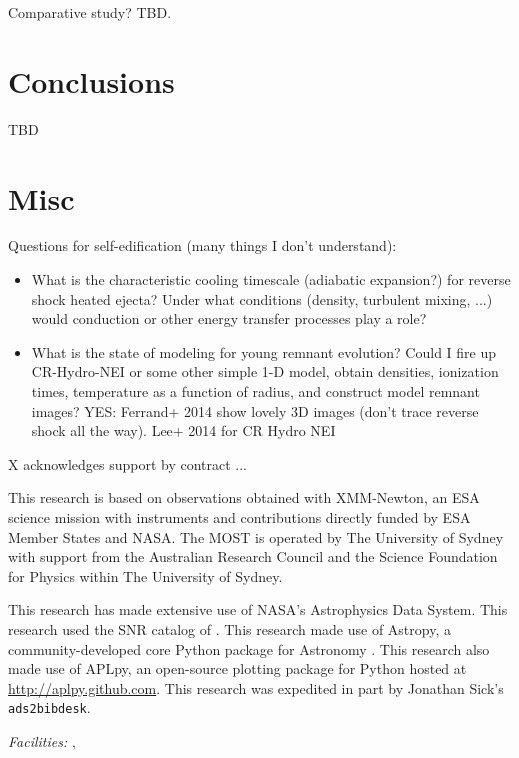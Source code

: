 \documentclass[preprint2,tighten,trackchanges]{aastex6}
\begin{document}
Comparative study?  TBD.

\section{Conclusions}

TBD

\section{Misc}

Questions for self-edification (many things I don't understand):
\begin{itemize}
    \item What is the characteristic cooling timescale (adiabatic expansion?)
        for reverse shock heated ejecta?
        Under what conditions (density, turbulent mixing, ...)
        would conduction or other energy transfer processes play a role?
    \item What is the state of modeling for young remnant evolution?
        Could I fire up CR-Hydro-NEI or some other simple 1-D model,
        obtain densities, ionization times, temperature as a function of
        radius, and construct model remnant images?
        YES: Ferrand+ 2014 show lovely 3D images (don't trace reverse shock all
        the way).
        Lee+ 2014 for CR Hydro NEI
\end{itemize}

\acknowledgments

X acknowledges support by contract ...

This research is based on observations obtained with XMM-Newton, an ESA science
mission with instruments and contributions directly funded by ESA Member States
and NASA.
The MOST is operated by The University of Sydney with support from the
Australian Research Council and the Science Foundation for Physics within The
University of Sydney.

This research has made extensive use of NASA's Astrophysics Data System.
This research used the SNR catalog of \citet{ferrand2012}.
This research made use of Astropy, a community-developed core Python package
for Astronomy \citep{astropy2013}.
This research also made use of APLpy, an open-source plotting package for
Python hosted at \href{http://aplpy.github.com}{http://aplpy.github.com}.
This research was expedited in part by Jonathan Sick's \texttt{ads2bibdesk}.

{\it Facilities:} , 
\end{document}
